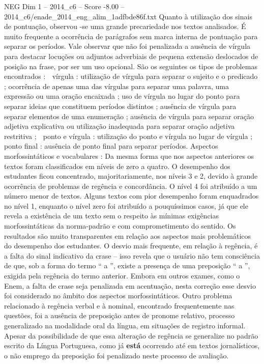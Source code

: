 \begin{textsample}{NEG Dim 1 – 2014\_c6 – Score -8.00 – 2014\_c6/enade\_2014\_eng\_alim\_1adfbde86f.txt}
Quanto à utilização dos sinais de pontuação, observou -se uma grande precariedade nos textos analisados.
É muito frequente a ocorrência de parágrafos sem marca interna de pontuação para separar os períodos.
Vale observar que não foi penalizada a ausência de vírgula para destacar locuções ou adjuntos adverbiais de pequena extensão deslocados de posição na frase, por ser um uso opcional.
São os seguintes os tipos de problemas encontrados :  vírgula : utilização de vírgula para separar o sujeito e o predicado ; ocorrência de apenas uma das vírgulas para separar uma palavra, uma expressão ou uma oração encaixada ; uso de vírgula no lugar do ponto para separar ideias que constituem períodos distintos ; ausência de vírgula para separar elementos de uma enumeração ; ausência de vírgula para separar oração adjetiva explicativa ou utilização inadequada para separar oração adjetiva restritiva ;  ponto e vírgula : utilização do ponto e vírgula no lugar de vírgula ;  ponto final : ausência de ponto final para separar períodos.
Aspectos morfossintáticos e vocabulares : Da mesma forma que nos aspectos anteriores os textos foram classificados em níveis de zero a quatro.
O desempenho dos estudantes ficou concentrado, majoritariamente, nos níveis 3 e 2, devido à grande ocorrência de problemas de regência e concordância.
O nível 4 foi atribuído a um número menor de textos.
Alguns textos com pior desempenho foram enquadrados no nível 1, enquanto o nível zero foi atribuído a pouquíssimos casos, já que ele revela a existência de um texto sem o respeito às mínimas exigências morfossintáticas da norma-padrão e com comprometimento do sentido.
Os resultados são muito transparentes em relação aos aspectos mais problemáticos do desempenho dos estudantes.
O desvio mais frequente, em relação à regência, é a falta do sinal indicativo da crase – isso revela que o usuário não tem consciência de que, sob a forma do termo “ a ”, existe a presença de uma preposição “ a ”, exigida pela regência do termo anterior.
Embora em outros exames, como o Enem, a falta de crase seja penalizada em acentuação, nesta correção esse desvio foi considerado no âmbito dos aspectos morfossintáticos.
Outro problema relacionado à regência verbal e à nominal, encontrado frequentemente nas questões, foi a ausência de preposição antes de pronome relativo, processo generalizado na modalidade oral da língua, em situações de registro informal.
Apesar da possibilidade de que essa alteração de regência se generalize no padrão escrito da Língua Portuguesa, como já \textbf{está} ocorrendo até em textos jornalísticos, o não emprego da preposição foi penalizado neste processo de avaliação.

\end{textsample}
